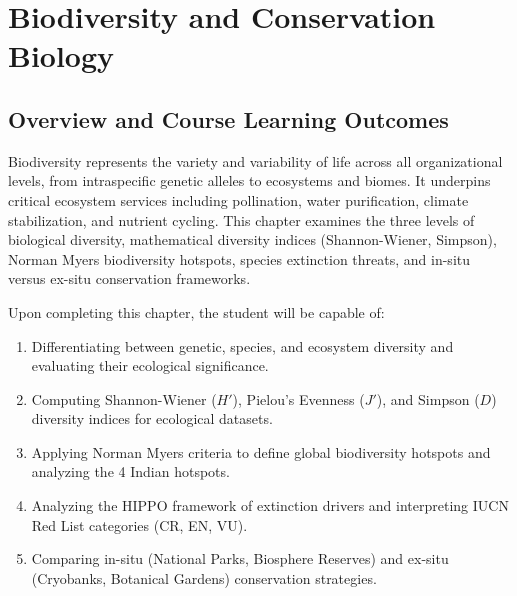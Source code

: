 \chapter{Biodiversity and Conservation Biology}
\label{chap:biodiversity-conservation}

\section{Overview and Course Learning Outcomes}
Biodiversity represents the variety and variability of life across all organizational levels, from intraspecific genetic alleles to ecosystems and biomes. It underpins critical ecosystem services including pollination, water purification, climate stabilization, and nutrient cycling. This chapter examines the three levels of biological diversity, mathematical diversity indices (Shannon-Wiener, Simpson), Norman Myers biodiversity hotspots, species extinction threats, and in-situ versus ex-situ conservation frameworks.

\begin{important}
Upon completing this chapter, the student will be capable of:
\begin{enumerate}[leftmargin=1.5em]
    \item Differentiating between genetic, species, and ecosystem diversity and evaluating their ecological significance.
    \item Computing Shannon-Wiener ($H'$), Pielou's Evenness ($J'$), and Simpson ($D$) diversity indices for ecological datasets.
    \item Applying Norman Myers criteria to define global biodiversity hotspots and analyzing the 4 Indian hotspots.
    \item Analyzing the HIPPO framework of extinction drivers and interpreting IUCN Red List categories (CR, EN, VU).
    \item Comparing in-situ (National Parks, Biosphere Reserves) and ex-situ (Cryobanks, Botanical Gardens) conservation strategies.
\end{enumerate}
\end{important}

